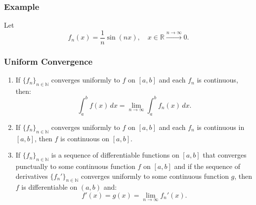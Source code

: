 \documentclass[11pt]{article}
\begin{document}
\subsubsection*{Example}
Let
\[f_n(x) = \frac{1}{n} \sin(nx), \quad x \in \mathbb{R} \stackrel{n \to \infty}{\longrightarrow} 0.\]

\begin{center}
\end{center}

\subsubsection{Uniform Convergence}
\begin{enumerate}
    \item If \(\{f_n\}_{n \in \mathbb{N}}\) converges uniformly to \(f\) on \([a, b]\) and each \(f_n\) is continuous, then:
        \[\int_a^b f(x) \, dx = \lim_{n \to \infty} \int_a^b f_n(x) \, dx.\]
    \item If \(\{f_n\}_{n \in \mathbb{N}}\) converges uniformly to \(f\) on \([a, b]\) and each \(f_n\) is continuous in \([a, b]\), then \(f\) is continuous on \([a, b]\).
    \item If \(\{f_n\}_{n \in \mathbb{N}}\) is a sequence of differentiable functions on \([a, b]\) that converges punctually to some continuous function \(f\) on \([a, b]\) and if the sequence of derivatives \(\{f_n'\}_{n \in \mathbb{N}}\) converges uniformly to some continuous function \(g\), then \(f\) is differentiable on \((a, b)\) and:
        \[f'(x) = g(x) = \lim_{n \to \infty} f_n'(x).\]
\end{enumerate}
\end{document}
